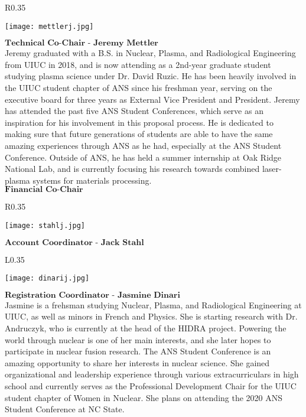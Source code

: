 \setlength\intextsep{0pt}
\begin{wrapfigure}{R}{0.35\textwidth}
	\begin{center}
		\vspace{-\baselineskip}
		\texttt{[image: mettlerj.jpg]}
	\end{center}
\end{wrapfigure}
$\textbf{Technical Co-Chair - Jeremy Mettler}$\\
Jeremy graduated with a B.S. in Nuclear, Plasma, and Radiological Engineering from UIUC in 2018, and is now attending as a 2nd-year graduate student studying plasma science under Dr. David Ruzic. He has been heavily involved in the UIUC student chapter of ANS since his freshman year, serving on the executive board for three years as External Vice President and President. Jeremy has attended the past five ANS Student Conferences, which serve as an inspiration for his involvement in this proposal process. He is dedicated to making sure that future generations of students are able to have the same amazing experiences through ANS as he had, especially at the ANS Student Conference. Outside of ANS, he has held a summer internship at Oak Ridge National Lab, and is currently focusing his research towards combined laser-plasma systems for materials processing.\\


$\textbf{Financial Co-Chair}$\\
\setlength\intextsep{0pt}
\begin{wrapfigure}{R}{0.35\textwidth}
	\begin{center}
		\vspace{-\baselineskip}
		\texttt{[image: stahlj.jpg]}
	\end{center}
\end{wrapfigure}
$\textbf{Account Coordinator - Jack Stahl}$\\
\lipsum[1-1]

\setlength\intextsep{0pt}
\begin{wrapfigure}{L}{0.35\textwidth}
	\begin{center}
		\vspace{-\baselineskip}
		\texttt{[image: dinarij.jpg]}
	\end{center}
\end{wrapfigure}
$\textbf{Registration Coordinator - Jasmine Dinari}$\\
Jasmine is a frehsman studying Nuclear, Plasma, and Radiological Engineering at UIUC, as well as minors in French and Physics. She is starting research with Dr. Andruczyk, who is currently at the head of the HIDRA project. Powering the world through nuclear is one of her main interests, and she later hopes to participate in nuclear fusion research. The ANS Student Conference is an  amazing opportunity to share her interests in nuclear science. She gained organizational and leadership experience through various extracurriculars in high school and currently serves as the Professional Development Chair for the UIUC student chapter of Women in Nuclear. She plans on attending the 2020 ANS Student Conference at NC State.



